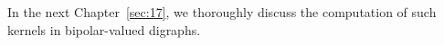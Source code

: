 \vspace{\baselineskip}
In the next Chapter~\ref{sec:17}, we thoroughly discuss the computation of such kernels in bipolar-valued digraphs.

%


